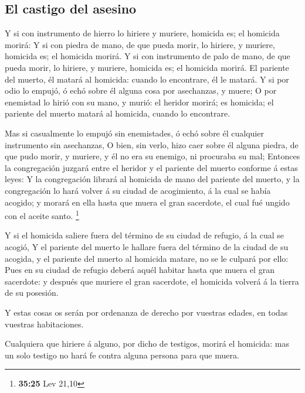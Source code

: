 \hypertarget{el-castigo-del-asesino}{%
\subsection{El castigo del asesino}\label{el-castigo-del-asesino}}

 Y si con instrumento de hierro lo hiriere y muriere,
homicida es; el homicida morirá:  Y si con piedra de mano,
de que pueda morir, lo hiriere, y muriere, homicida es; el homicida
morirá.  Y si con instrumento de palo de mano, de que pueda
morir, lo hiriere, y muriere, homicida es; el homicida morirá.
 El pariente del muerto, él matará al homicida: cuando lo
encontrare, él le matará.  Y si por odio lo empujó, ó echó
sobre él alguna cosa por asechanzas, y muere;  O por
enemistad lo hirió con su mano, y murió: el heridor morirá; es homicida;
el pariente del muerto matará al homicida, cuando lo encontrare.

 Mas si casualmente lo empujó sin enemistades, ó echó sobre
él cualquier instrumento sin asechanzas,  O bien, sin
verlo, hizo caer sobre él alguna piedra, de que pudo morir, y muriere, y
él no era su enemigo, ni procuraba su mal;  Entonces la
congregación juzgará entre el heridor y el pariente del muerto conforme
á estas leyes:  Y la congregación librará al homicida de
mano del pariente del muerto, y la congregación lo hará volver á su
ciudad de acogimiento, á la cual se había acogido; y morará en ella
hasta que muera el gran sacerdote, el cual fué ungido con el aceite
santo. \footnote{\textbf{35:25} Lev 21,10}

 Y si el homicida saliere fuera del término de su ciudad de
refugio, á la cual se acogió,  Y el pariente del muerto le
hallare fuera del término de la ciudad de su acogida, y el pariente del
muerto al homicida matare, no se le culpará por ello:  Pues
en su ciudad de refugio deberá aquél habitar hasta que muera el gran
sacerdote: y después que muriere el gran sacerdote, el homicida volverá
á la tierra de su posesión.

 Y estas cosas os serán por ordenanza de derecho por
vuestras edades, en todas vuestras habitaciones.

 Cualquiera que hiriere á alguno, por dicho de testigos,
morirá el homicida: mas un solo testigo no hará fe contra alguna persona
para que muera.


